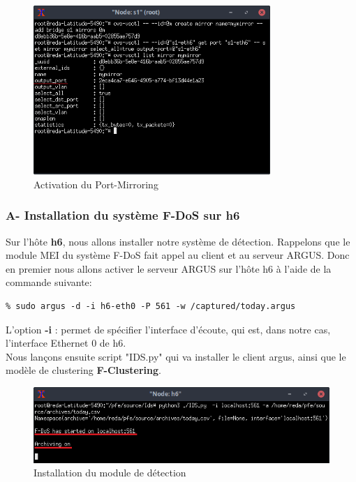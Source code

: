 \begin{figure}[H]
\centering
\includegraphics[width=0.8\textwidth]{Figures/simulation/mininet/switch/create_mirroring_port}
\decoRule
\caption{Activation du Port-Mirroring}
\label{fig:portMirroring}
\end{figure}

\subsubsection{A- Installation du système F-DoS sur h6}
Sur l'hôte \textbf{h6}, nous allons installer notre système de détection. Rappelons que le module MEI du système F-DoS fait appel au client et au serveur ARGUS. Donc en premier nous allons activer le serveur ARGUS sur l'hôte h6 à l'aide de la commande suivante:
\begin{verbatim}
% sudo argus -d -i h6-eth0 -P 561 -w /captured/today.argus
\end{verbatim}
L'option \textbf{-i} : permet de spécifier l'interface d'écoute, qui est, dans notre cas, l'interface Ethernet 0 de h6.\\

\noindent Nous lançons ensuite script "IDS.py" qui va installer le client argus, ainsi que le modèle de clustering \textbf{F-Clustering}.
\begin{figure}[h]
\centering
\includegraphics[width=\textwidth]{Figures/simulation/mininet/IDS/start}
\decoRule
\caption{Installation du module de détection}
\label{fig:fileServer}
\end{figure}
\newpage
